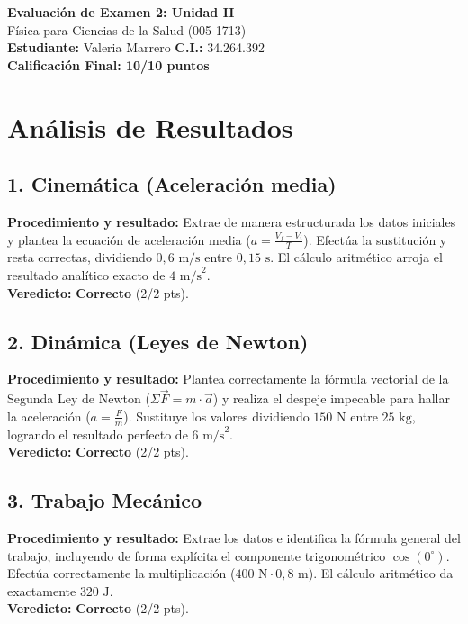 \documentclass[12pt,letterpaper]{article}
\begin{document}
\begin{center}
    \Large \textbf{Evaluación de Examen 2: Unidad II} \\
    \large Física para Ciencias de la Salud (005-1713) \\
    \vspace{0.5cm}
    \textbf{Estudiante:} Valeria Marrero \quad \textbf{C.I.:} 34.264.392
    \vspace{0.3cm} \\
    \large \textbf{Calificación Final: 10/10 puntos}
\end{center}

\vspace{0.5cm}

\section*{Análisis de Resultados}

\subsection*{1. Cinemática (Aceleración media)}
\textbf{Procedimiento y resultado:} Extrae de manera estructurada los datos iniciales y plantea la ecuación de aceleración media ($a = \frac{V_f - V_i}{T}$). Efectúa la sustitución y resta correctas, dividiendo $0,6 \text{ m/s}$ entre $0,15 \text{ s}$. El cálculo aritmético arroja el resultado analítico exacto de $4 \text{ m/s}^2$. \\
\textbf{Veredicto:} \textbf{Correcto} (2/2 pts).

\subsection*{2. Dinámica (Leyes de Newton)}
\textbf{Procedimiento y resultado:} Plantea correctamente la fórmula vectorial de la Segunda Ley de Newton ($\Sigma \vec{F} = m \cdot \vec{a}$) y realiza el despeje impecable para hallar la aceleración ($a = \frac{F}{m}$). Sustituye los valores dividiendo $150 \text{ N}$ entre $25 \text{ kg}$, logrando el resultado perfecto de $6 \text{ m/s}^2$. \\
\textbf{Veredicto:} \textbf{Correcto} (2/2 pts).

\subsection*{3. Trabajo Mecánico}
\textbf{Procedimiento y resultado:} Extrae los datos e identifica la fórmula general del trabajo, incluyendo de forma explícita el componente trigonométrico $\cos(0^\circ)$. Efectúa correctamente la multiplicación ($400 \text{ N} \cdot 0,8 \text{ m}$). El cálculo aritmético da exactamente $320 \text{ J}$. \\
\textbf{Veredicto:} \textbf{Correcto} (2/2 pts).
\end{document}
